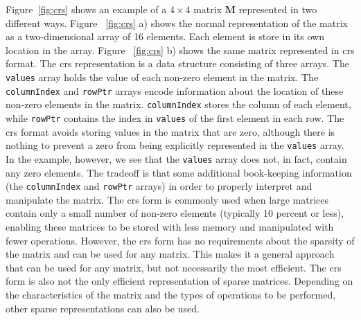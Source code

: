 Figure~\ref{fig:crs} shows an example of a $4 \times 4$ matrix $\mathbf{M}$ represented in two different ways.  Figure ~\ref{fig:crs} a) shows the normal representation of the matrix as a two-dimensional array of 16 elements.  Each element is store in its own location in the array.  Figure ~\ref{fig:crs} b) shows the same matrix represented in \gls{crs} format.   The \gls{crs} representation is a data structure consisting of three arrays.  The \lstinline{values} array holds the value of each non-zero element in the matrix. The \lstinline{columnIndex} and \lstinline{rowPtr} arrays encode information about the location of these non-zero elements in the matrix. \lstinline{columnIndex} stores the column of each element, while \lstinline{rowPtr} contains the index in \lstinline|values| of the first element in each row. The \gls{crs} format avoids storing values in the matrix that are zero, although there is nothing to prevent a zero from being explicitly represented in the \lstinline|values| array.  In the example, however, we see that the \lstinline|values| array does not, in fact, contain any zero elements.  The tradeoff is that some additional book-keeping information (the \lstinline|columnIndex| and \lstinline|rowPtr| arrays) in order to properly interpret and manipulate the matrix.  The \gls{crs} form is commonly used when large matrices contain only a small number of non-zero elements (typically 10 percent or less), enabling these matrices to be stored with less memory and manipulated with fewer operations. However, the \gls{crs} form has no requirements about the sparsity of the matrix and can be used for any matrix. This makes it a general approach that can be used for any matrix, but not necessarily the most efficient.  The \gls{crs} form is also not the only efficient representation of sparse matrices.  Depending on the characteristics of the matrix and the types of operations to be performed, other sparse representations can also be used.

